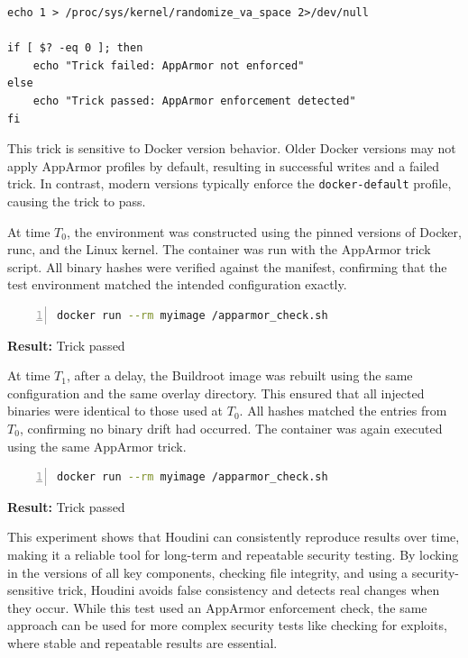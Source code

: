 \begin{doublespace}
\begin{lstlisting}
echo 1 > /proc/sys/kernel/randomize_va_space 2>/dev/null

if [ $? -eq 0 ]; then
    echo "Trick failed: AppArmor not enforced"
else
    echo "Trick passed: AppArmor enforcement detected"
fi
\end{lstlisting}

This trick is sensitive to Docker version behavior. Older Docker versions may not apply AppArmor profiles by default, resulting in successful writes and a failed trick. In contrast, modern versions typically enforce the \texttt{docker-default} profile, causing the trick to pass.


At time \( T_0 \), the environment was constructed using the pinned versions of Docker, runc, and the Linux kernel. The container was run with the AppArmor trick script. All binary hashes were verified against the manifest, confirming that the test environment matched the intended configuration exactly. 

\begin{lstlisting}[language=bash, caption={Running the AppArmor Trick in a Container}, label={lst:run-apparmor-trick}, numbers=left, numberstyle=\tiny, stepnumber=1, frame=single, breaklines=true, backgroundcolor=\color{gray!10}, basicstyle=\ttfamily\footnotesize, showspaces=false, showstringspaces=false]
docker run --rm myimage /apparmor_check.sh
\end{lstlisting}

\noindent\textbf{Result:} Trick passed


At time \( T_1 \), after a delay, the Buildroot image was rebuilt using the same configuration and the same overlay directory. This ensured that all injected binaries were identical to those used at \( T_0 \). All hashes matched the entries from \( T_0 \), confirming no binary drift had occurred. The container was again executed using the same AppArmor trick.

\begin{lstlisting}[language=bash, caption={Running the AppArmor Trick in a Container (\( T_1 \))}, label={lst:run-apparmor-trick-t1}, numbers=left, numberstyle=\tiny, stepnumber=1, frame=single, breaklines=true, backgroundcolor=\color{gray!10}, basicstyle=\ttfamily\footnotesize, showspaces=false, showstringspaces=false]
docker run --rm myimage /apparmor_check.sh
\end{lstlisting}

\noindent\textbf{Result:} Trick passed

This experiment shows that Houdini can consistently reproduce results over time, making it a reliable tool for long-term and repeatable security testing. By locking in the versions of all key components, checking file integrity, and using a security-sensitive trick, Houdini avoids false consistency and detects real changes when they occur. While this test used an AppArmor enforcement check, the same approach can be used for more complex security tests like checking for exploits, where stable and repeatable results are essential.


\end{doublespace}
